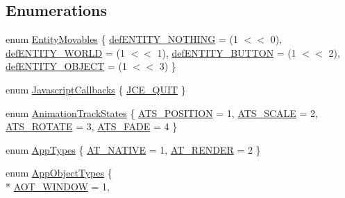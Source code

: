 \subsection*{Enumerations}
\begin{DoxyCompactItemize}
\item 
enum \hyperlink{namespace_rad_xml_a48b56f606dc4d93f4a246181b53ac716}{Entity\-Movables} \{ \hyperlink{namespace_rad_xml_a48b56f606dc4d93f4a246181b53ac716aeed068b7ccb3dd5db8e40403f600fd3c}{def\-E\-N\-T\-I\-T\-Y\-\_\-\-N\-O\-T\-H\-I\-N\-G} =  (1 $<$$<$ 0), 
\hyperlink{namespace_rad_xml_a48b56f606dc4d93f4a246181b53ac716a75ae6d8a77799c4cf8878138183f4c0d}{def\-E\-N\-T\-I\-T\-Y\-\_\-\-W\-O\-R\-L\-D} =  (1 $<$$<$ 1), 
\hyperlink{namespace_rad_xml_a48b56f606dc4d93f4a246181b53ac716a787b93e3ad7053cd1df62874e91f11d7}{def\-E\-N\-T\-I\-T\-Y\-\_\-\-B\-U\-T\-T\-O\-N} =  (1 $<$$<$ 2), 
\hyperlink{namespace_rad_xml_a48b56f606dc4d93f4a246181b53ac716a5ac5f7537e89899bd04f49f95be311e3}{def\-E\-N\-T\-I\-T\-Y\-\_\-\-O\-B\-J\-E\-C\-T} =  (1 $<$$<$ 3)
 \}
\item 
enum \hyperlink{namespace_rad_xml_a9dea9811639a864556372e90c4800888}{Javascript\-Callbacks} \{ \hyperlink{namespace_rad_xml_a9dea9811639a864556372e90c4800888a1f3d44660d3d69906a569e94bef8d474}{J\-C\-E\-\_\-\-Q\-U\-I\-T}
 \}
\item 
enum \hyperlink{namespace_rad_xml_a1614b625f8a696ba273accb08a1e8213}{Animation\-Track\-States} \{ \hyperlink{namespace_rad_xml_a1614b625f8a696ba273accb08a1e8213a06f9c05d1aef3c54d253c9ccbf8174ee}{A\-T\-S\-\_\-\-P\-O\-S\-I\-T\-I\-O\-N} =  1, 
\hyperlink{namespace_rad_xml_a1614b625f8a696ba273accb08a1e8213a4721498936f22f87fe59c7dbb91b2a9d}{A\-T\-S\-\_\-\-S\-C\-A\-L\-E} =  2, 
\hyperlink{namespace_rad_xml_a1614b625f8a696ba273accb08a1e8213afdcb31fc76006b76b8f0621d00665284}{A\-T\-S\-\_\-\-R\-O\-T\-A\-T\-E} =  3, 
\hyperlink{namespace_rad_xml_a1614b625f8a696ba273accb08a1e8213a6ae50fa783a029e2adc6da88f3448eda}{A\-T\-S\-\_\-\-F\-A\-D\-E} =  4
 \}
\item 
enum \hyperlink{namespace_rad_xml_a7f02a03183d1ff797239c27bfd5b0171}{App\-Types} \{ \hyperlink{namespace_rad_xml_a7f02a03183d1ff797239c27bfd5b0171a7267f594265157d5d86a8b3ee84ec145}{A\-T\-\_\-\-N\-A\-T\-I\-V\-E} =  1, 
\hyperlink{namespace_rad_xml_a7f02a03183d1ff797239c27bfd5b0171a710cf8e9a1e35268ba5a9c658226c2c3}{A\-T\-\_\-\-R\-E\-N\-D\-E\-R} =  2
 \}
\item 
enum \hyperlink{namespace_rad_xml_a4486b4da9819e125b2b10194b761518c}{App\-Object\-Types} \{ \\*
\hyperlink{namespace_rad_xml_a4486b4da9819e125b2b10194b761518cabd3358a5ee631d0222be98282629932d}{A\-O\-T\-\_\-\-W\-I\-N\-D\-O\-W} =  1, 

\end{DoxyCompactItemize}
